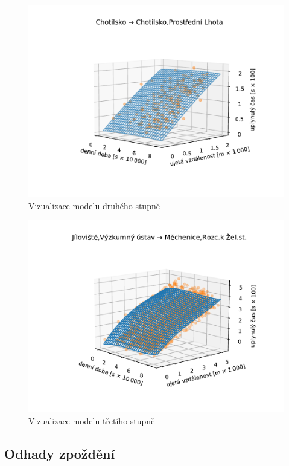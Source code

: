 \begin{figure}
   \centering
 \includegraphics[width=\linewidth]{../img/23_24}
 \caption{Vizualizace modelu druhého stupně}
 \label{fig:second_degree}
\end{figure}

\begin{figure}
   \centering
 \includegraphics[width=\linewidth]{../img/thrd_degree}
 \caption{Vizualizace modelu třetího stupně}
 \label{fig:thrd_degree}
\end{figure}


\subsection{Odhady zpoždění} \label{subsection:odhady_zpozdeni}

